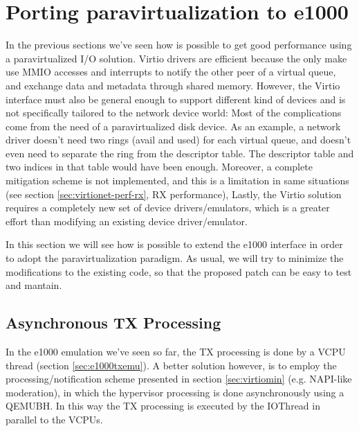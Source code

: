 \section{Porting paravirtualization to e1000}
In the previous sections we've seen how is possible to get good performance using a paravirtualized I/O solution. Virtio drivers are
efficient because the only make use MMIO accesses and interrupts to notify the other peer of a virtual queue, and exchange data and
metadata through shared memory.
However, the Virtio interface must also be general enough to support different kind of devices and is not specifically tailored to the
network device world: Most of the complications come from the need of a paravirtualized disk device. As an example, a network driver
doesn't need two rings (avail and used) for each virtual queue, and doesn't even need to separate the ring from the descriptor table. The
descriptor table and two indices in that table would have been enough.
Moreover, a complete mitigation scheme is not implemented, and this is a limitation in same situations (see section
\ref{sec:virtionet-perf-rx}, RX performance),
Lastly, the Virtio solution requires a completely new set of device drivers/emulators, which is a greater effort than modifying
an existing device driver/emulator.

\vspace{0.5cm}

In this section we will see how is possible to extend the e1000 interface in order to adopt the paravirtualization paradigm.
As usual, we will try to minimize the modifications to the existing code, so that the proposed patch can be easy to test and mantain.


\subsection{Asynchronous TX Processing}
\label{sec:e1000-par-async}
In the e1000 emulation we've seen so far, the TX processing is done by a VCPU thread (section \ref{sec:e1000txemu}).
A better solution however, is to employ the processing/notification scheme presented in section \ref{sec:virtiomin} (e.g. NAPI-like 
moderation), in which the hypervisor processing is done asynchronously using a QEMUBH.
In this way the TX processing is executed by the IOThread in parallel to the VCPUs.


